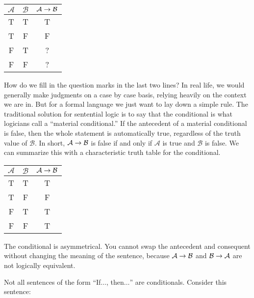 \begin{center}
\begin{tabular}{c|c|c}
$\mathcal{A}$ & $\mathcal{B}$ & $\mathcal{A}\mathrel{\rightarrow}\mathcal{B}$\\
\hline
T & T & T\\
T & F & F\\
F & T & ?\\
F & F & ?
\end{tabular}
\end{center}

How do we fill in the question marks in the last two lines?  In real life, we would generally make judgments on a case by case basis, relying heavily on the context we are in. But for a formal language we just want to lay down a simple rule. The traditional solution for sentential logic is to say that the conditional is what logicians call a ``material conditional.'' If the antecedent of a material conditional is false, then the whole statement is automatically true, regardless of the truth value of $\mathcal{B}$. In short, $\mathcal{A}\mathrel{\rightarrow}\mathcal{B}$ is false if and only if $\mathcal{A}$ is true and $\mathcal{B}$ is false. We can summarize this with a characteristic truth table for the conditional.

\begin{center}
\begin{tabular}{c|c|c}
$\mathcal{A}$ & $\mathcal{B}$ & $\mathcal{A}\mathrel{\rightarrow}\mathcal{B}$\\
\hline
T & T & T\\
T & F & F\\
F & T & T\\
F & F & T
\end{tabular}
\end{center}

The conditional is asymmetrical. You cannot swap the antecedent and consequent without changing the meaning of the sentence, because $\mathcal{A} \mathrel{\rightarrow}\mathcal{B}$ and $\mathcal{B}\mathrel{\rightarrow}\mathcal{A}$ are not logically equivalent.


Not all sentences of the form ``If$\ldots$, then$\ldots$'' are conditionals. Consider this sentence:

